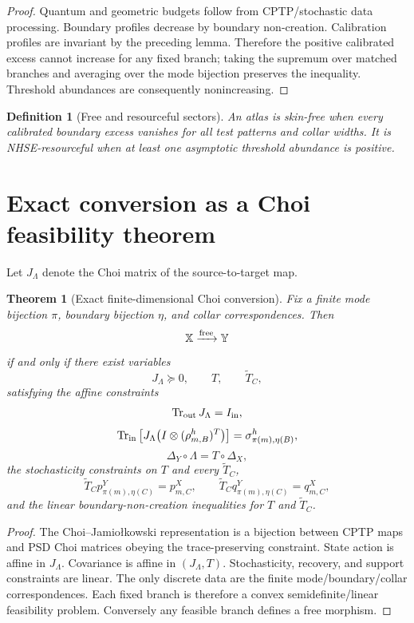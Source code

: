 \documentclass[11pt]{article}
\newtheorem{definition}{Definition}
\newtheorem{theorem}{Theorem}
\newcommand{\Tr}{\operatorname{Tr}}
\begin{document}
\begin{proof}
Quantum and geometric budgets follow from CPTP/stochastic data processing. Boundary
profiles decrease by boundary non-creation. Calibration profiles are invariant by the
preceding lemma. Therefore the positive calibrated excess cannot increase for any fixed
branch; taking the supremum over matched branches and averaging over the mode bijection
preserves the inequality. Threshold abundances are consequently nonincreasing.
\end{proof}

\begin{definition}[Free and resourceful sectors]
An atlas is skin-free when every calibrated boundary excess vanishes for all test patterns
and collar widths. It is NHSE-resourceful when at least one asymptotic threshold abundance
is positive.
\end{definition}

\section{Exact conversion as a Choi feasibility theorem}
\label{sec:choi}

Let $J_\Lambda$ denote the Choi matrix of the source-to-target map.

\begin{theorem}[Exact finite-dimensional Choi conversion]
Fix a finite mode bijection $\pi$, boundary bijection $\eta$, and collar correspondences. Then
\[
\mathbb X\xrightarrow{\rm free}\mathbb Y
\]
if and only if there exist variables
\[
J_\Lambda\succeq0,
\qquad
T,
\qquad
\widetilde T_C,
\]
satisfying the affine constraints
\[
\Tr_{\rm out}J_\Lambda=I_{\rm in},
\]
\[
\Tr_{\rm in}
\left[J_\Lambda
\bigl(I\otimes(\rho_{m,B}^{h})^T\bigr)\right]
=
\sigma_{\pi(m),\eta(B)}^h,
\]
\[
\Delta_Y\circ\Lambda=T\circ\Delta_X,
\]
the stochasticity constraints on $T$ and every $\widetilde T_C$,
\[
\widetilde T_C p_{\pi(m),\eta(C)}^Y=p_{m,C}^X,
\qquad
\widetilde T_C q_{\pi(m),\eta(C)}^Y=q_{m,C}^X,
\]
and the linear boundary-non-creation inequalities for $T$ and $\widetilde T_C$.
\end{theorem}

\begin{proof}
The Choi--Jamio\l{}kowski representation is a bijection between CPTP maps and PSD Choi matrices obeying the trace-preserving constraint. State action is affine in $J_\Lambda$. Covariance is affine in $(J_\Lambda,T)$. Stochasticity, recovery, and support constraints are linear. The only discrete data are the finite mode/boundary/collar correspondences. Each fixed branch is therefore a convex semidefinite/linear feasibility problem. Conversely any feasible branch defines a free morphism.
\end{proof}
\end{document}
